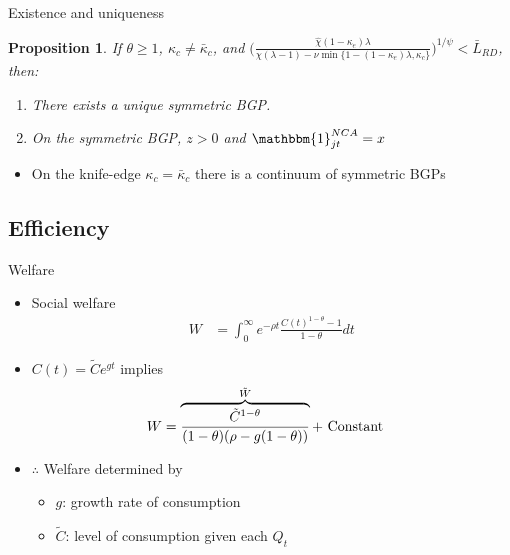 \documentclass[english,usenames,dvipsnames,handout]{beamer}
\newtheorem{proposition}{Proposition}
\begin{document}
\begin{frame}{Existence and uniqueness}\label{existence_and_uniqueness}\hyperlink{eq_innovation_and_growth}{} 
	\begin{proposition}\label{proposition:purstrategyeq:positiveOI}
		If $\theta \ge 1$, $\kappa_c \ne \bar{\kappa}_c$, and $\Big( \frac{\hat{\chi} (1-\kappa_{e}) \lambda}{\chi(\lambda-1) - \nu \min\{ 1-(1-\kappa_e) \lambda, \kappa_c \}} \Big)^{1/\psi} < \bar{L}_{RD}$, then:
		\begin{enumerate}
			\item There exists a unique symmetric BGP.
			\item On the symmetric BGP, $z > 0$ and $\mathbbm{1}^{NCA}_{jt} = x$
		\end{enumerate}
	\end{proposition}
	\begin{itemize}
		\item On the knife-edge $\kappa_c = \bar{\kappa}_c$ there is a continuum of symmetric BGPs
	\end{itemize}
\end{frame}

\subsection{Efficiency}

\begin{frame}{Welfare}\label{welfare}
	\hyperlink{efficiency}{}
	\begin{itemize}
		\item Social welfare
		\begin{align*}
		W &= \int_0^{\infty} e^{-\rho t} \frac{C(t)^{1-\theta} - 1}{1-\theta} dt
		\end{align*}
		\item $C(t) = \tilde{C} e^{gt}$ implies
		\begin{align*}
		W &= \overbrace{\frac{\tilde{C}^{1-\theta}}{(1-\theta)(\rho - g(1-\theta))}}^{\mathclap{\tilde{W}}} + \text{ Constant} 
		\end{align*}
		\item $\therefore$ Welfare determined by
		\begin{itemize}
			\item $g$: growth rate of consumption 
			\item $\tilde{C}$: level of consumption given each $Q_t$ 
		\end{itemize}
	\end{itemize}
\end{frame}
\end{document}
